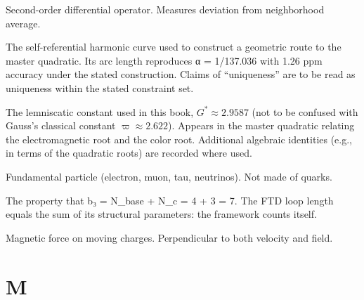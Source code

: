 \documentclass[
  11pt,
  letterpaper,
  twoside,
  openright]{book}
\providecommand{\tightlist}{%
  \setlength{\itemsep}{0pt}\setlength{\parskip}{0pt}}
\begin{document}
\begin{description}
\tightlist
\item[\textbf{Laplacian}]
Second-order differential operator. Measures deviation from neighborhood
average.
\item[\textbf{Lemniscate-Alpha Curve}]
The self-referential harmonic curve used to construct a geometric route
to the master quadratic. Its arc length reproduces α = 1/137.036 with
1.26 ppm accuracy under the stated construction. Claims of
``uniqueness'' are to be read as uniqueness within the stated constraint
set.
\item[**Lemniscatic Constant (G*)**]
The lemniscatic constant used in this book, \(G^*\approx 2.9587\) (not
to be confused with Gauss's classical constant \(\varpi\approx 2.622\)).
Appears in the master quadratic relating the electromagnetic root and
the color root. Additional algebraic identities (e.g., in terms of the
quadratic roots) are recorded where used.
\item[\textbf{Lepton}]
Fundamental particle (electron, muon, tau, neutrinos). Not made of
quarks.
\item[\textbf{Loop Self-Enumeration}]
The property that b₃ = N\_base + N\_c = 4 + 3 = 7. The FTD loop length
equals the sum of its structural parameters: the framework counts
itself.
\item[\textbf{Lorentz Force}]
Magnetic force on moving charges. Perpendicular to both velocity and
field.
\end{description}

\section{M}\label{m}
\end{document}
